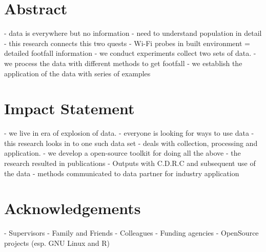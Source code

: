 \section*{Abstract}
 - data is everywhere but no information
 - need to understand population in detail
 - this research connects this two quests
 - Wi-Fi probes in built environment = detailed footfall information
 - we conduct experiments collect two sets of data.
 - we process the data with different methods to get footfall
 - we establish the application of the data with series of examples


\section*{Impact Statement}
 - we live in era of explosion of data.
 - everyone is looking for ways to use data
 - this research looks in to one such data set
 - deals with collection, processing and application.
 - we develop a open-source toolkit for doing all the above
 - the research resulted in publications
 - Outputs with C.D.R.C and subsequent use of the data 
 - methods communicated to data partner for industry application  


\section*{Acknowledgements}
 - Supervisors
 - Family and Friends
 - Colleagues
 - Funding agencies
 - OpenSource projects (esp. GNU Linux and R)
